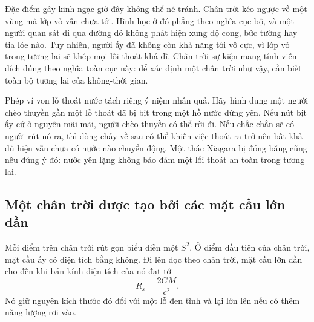 Đặc điểm gây kinh ngạc giờ đây không thể né tránh. Chân trời kéo ngược về một vùng mà lớp vỏ vẫn chưa tới. Hình học ở đó phẳng theo nghĩa cục bộ, và một người quan sát đi qua đường đó không phát hiện xung độ cong, bức tường hay tia lóe nào. Tuy nhiên, người ấy đã không còn khả năng tới vô cực, vì lớp vỏ trong tương lai sẽ khép mọi lối thoát khả dĩ. Chân trời sự kiện mang tính viễn đích đúng theo nghĩa toàn cục này: để xác định một chân trời như vậy, cần biết toàn bộ tương lai của không-thời gian.

Phép ví von lỗ thoát nước tách riêng ý niệm nhân quả. Hãy hình dung một người chèo thuyền gần một lỗ thoát đã bị bịt trong một hồ nước đứng yên. Nếu nút bịt ấy cứ ở nguyên mãi mãi, người chèo thuyền có thể rời đi. Nếu chắc chắn sẽ có người rút nó ra, thì dòng chảy về sau có thể khiến việc thoát ra trở nên bất khả dù hiện vẫn chưa có nước nào chuyển động. Một thác Niagara bị đóng băng cũng nêu đúng ý đó: nước yên lặng không bảo đảm một lối thoát an toàn trong tương lai.

\begin{classroomqa}
\end{classroomqa}

\subsection{Một chân trời được tạo bởi các mặt cầu lớn dần}

Mỗi điểm trên chân trời rút gọn biểu diễn một \(S^2\). Ở điểm đầu tiên của chân trời, mặt cầu ấy có diện tích bằng không. Đi lên dọc theo chân trời, mặt cầu lớn dần cho đến khi bán kính diện tích của nó đạt tới
\begin{equation}
R_s=\frac{2GM}{c^2}.
\end{equation}
Nó giữ nguyên kích thước đó đối với một lỗ đen tĩnh và lại lớn lên nếu có thêm năng lượng rơi vào.

